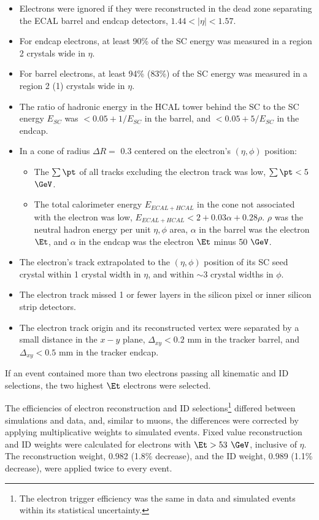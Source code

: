 \begin{itemize}
	\item Electrons were ignored if they were reconstructed in the dead zone separating the ECAL barrel and 
		endcap detectors, $1.44 < |\eta| < 1.57$.
	\item For endcap electrons, at least 90\% of the SC energy was measured in a region 2 crystals wide in $\eta$.
	\item For barrel electrons, at least 94\% (83\%) of the SC energy was measured in a region 2 (1) crystals wide 
		in $\eta$.
	\item The ratio of hadronic energy in the HCAL tower behind the SC to the SC energy $E_{SC}$ was $< 0.05 + 1/E_{SC}$ 
		in the barrel, and $< 0.05 + 5/E_{SC}$ in the endcap.
	\item In a cone of radius $\Delta R =$ 0.3 centered on the electron's $(\eta, \phi)$ position:
	\begin{itemize}
		\item The $\sum \pt$ of all tracks excluding the electron track was low, $\sum \pt < 5$ $\GeV$.
		\item The total calorimeter energy $E_{ECAL + HCAL}$ in the cone not associated with the electron was low, 
			$E_{ECAL + HCAL} < 2 + 0.03\alpha + 0.28\rho$.  $\rho$ was the neutral hadron energy per unit $\eta,\phi$ area, 
			$\alpha$ in the barrel was the electron $\Et$, and $\alpha$ in the endcap was the electron $\Et$ minus 50 $\GeV$.
	\end{itemize}
	\item The electron's track extrapolated to the $(\eta, \phi)$ position of its SC seed crystal within 1 crystal width in 
		$\eta$, and within $\sim$3 crystal widths in $\phi$.
	\item The electron track missed 1 or fewer layers in the silicon pixel or inner silicon strip detectors.
	\item The electron track origin and its reconstructed vertex were separated by a small distance in the $x-y$ plane, 
		$\Delta_{xy} < 0.2$ mm in the tracker barrel, and $\Delta_{xy} < 0.5$ mm in the tracker endcap.
\end{itemize}

If an event contained more than two electrons passing all kinematic and ID selections, the two highest $\Et$ 
electrons were selected.

The efficiencies of electron reconstruction and ID selections\footnote{The electron trigger efficiency was the same 
in data and simulated events within its statistical uncertainty.} differed between simulations and data, and, similar 
to muons, the differences were corrected by applying multiplicative weights to simulated events.  Fixed value reconstruction 
and ID weights were calculated for electrons with $\Et > 53$ $\GeV$, inclusive of $\eta$.  The reconstruction 
weight, 0.982 (1.8\% decrease), and the ID weight, 0.989 (1.1\% decrease), were applied twice to every event.


